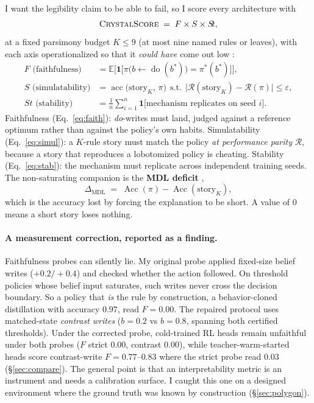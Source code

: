 \documentclass[11pt]{article}
\newcommand{\E}{\mathbb{E}}
\newcommand{\ind}{\mathbf{1}}
\begin{document}
I want the legibility claim to be able to fail, so I score every architecture with
\begin{equation}
\textsc{CrystalScore} \;=\; F \times S \times S\!t,
\label{eq:cs}
\end{equation}
at a fixed parsimony budget $K \le 9$ (at most nine named rules or leaves), with each axis
operationalized so that it \emph{could have} come out low
\citep{doshivelez2017,jacovi2020,lipton2018}:
\begin{align}
F \text{ (faithfulness)} &= \E\Big[\ind\big[\pi\big(b \leftarrow \operatorname{do}(b^{*})\big)
= \pi^{*}(b^{*})\big]\Big],
\label{eq:faith}\\[3pt]
S \text{ (simulatability)} &= \operatorname{acc}\big(\text{story}_{K},\, \pi\big)
\ \ \text{s.t.}\ \ \big|\mathcal{R}(\text{story}_K) - \mathcal{R}(\pi)\big| \le \varepsilon,
\label{eq:simul}\\[3pt]
S\!t \text{ (stability)} &= \frac{1}{n}\sum_{i=1}^{n}
\ind\big[\text{mechanism replicates on seed } i\big].
\label{eq:stab}
\end{align}
Faithfulness (Eq.~\ref{eq:faith}): \emph{do}-writes must land, judged against a reference
optimum rather than against the policy's own habits. Simulatability (Eq.~\ref{eq:simul}): a
$K$-rule story must match the policy \emph{at performance parity} $\mathcal{R}$, because a story
that reproduces a lobotomized policy is cheating. Stability (Eq.~\ref{eq:stab}): the mechanism
must replicate across independent training seeds. The non-saturating companion is the \textbf{MDL
deficit} \citep{rissanen1978},
\begin{equation}
\Delta_{\text{MDL}} \;=\; \operatorname{Acc}(\pi) - \operatorname{Acc}(\text{story}_{K}),
\label{eq:mdl}
\end{equation}
which is the accuracy lost by forcing the explanation to be short. A value of $0$ means a short
story loses nothing.

\paragraph{A measurement correction, reported as a finding.} Faithfulness probes can silently
lie. My original probe applied fixed-size belief writes ($+0.2/+0.4$) and checked whether the
action followed. On threshold policies whose belief input saturates, such writes never cross
the decision boundary. So a policy that \emph{is} the rule by construction, a behavior-cloned
distillation with accuracy $0.97$, read $F{=}0.00$. The repaired protocol uses matched-state
\emph{contrast writes} ($b{=}0.2$ vs $b{=}0.8$, spanning both certified thresholds). Under the
corrected probe, cold-trained RL heads remain unfaithful under both probes ($F$ strict $0.00$,
contrast $0.00$), while teacher-warm-started heads score contrast-write $F = 0.77$--$0.83$ where
the strict probe read $0.03$ (\S\ref{sec:compare}). The general point is that an interpretability
metric is an instrument and needs a calibration surface. I caught this one on a designed
environment where the ground truth was known by construction (\S\ref{sec:polygon}).
\end{document}

